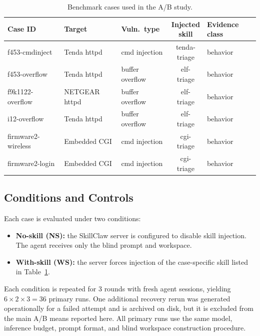 ﻿\documentclass[preprint,12pt]{elsarticle}
\begin{document}
\begin{table}[t]
\centering
\caption{Benchmark cases used in the A/B study.}
\label{tab:cases}
\footnotesize
\begin{tabular}{l l l c l}
\toprule
Case ID & Target & Vuln.\ type & \makecell[c]{Injected\\skill} & Evidence class \\
\midrule
f453-cmdinject & Tenda httpd & cmd injection & \makecell[l]{tenda-\\triage} & behavior \\
f453-overflow & Tenda httpd & buffer overflow & \makecell[l]{elf-\\triage} & behavior \\
f9k1122-overflow & NETGEAR httpd & buffer overflow & \makecell[l]{elf-\\triage} & behavior \\
i12-overflow & Tenda httpd & buffer overflow & \makecell[l]{elf-\\triage} & behavior \\
firmware2-wireless & Embedded CGI & cmd injection & \makecell[l]{cgi-\\triage} & behavior \\
firmware2-login & Embedded CGI & cmd injection & \makecell[l]{cgi-\\triage} & behavior \\
\bottomrule
\end{tabular}
\end{table}

\subsection{Conditions and Controls}

Each case is evaluated under two conditions:
\begin{itemize}[leftmargin=*]
    \item \textbf{No-skill (NS):} the SkillClaw server is configured to
    disable skill injection.  The agent receives only the blind prompt and
    workspace.
    \item \textbf{With-skill (WS):} the server forces injection of the
    case-specific skill listed in Table~\ref{tab:cases}.
\end{itemize}

Each condition is repeated for 3 rounds with fresh agent sessions, yielding
$6 \times 2 \times 3 = 36$ primary runs.  One additional recovery rerun was
generated operationally for a failed attempt and is archived on disk, but
it is excluded from the main A/B means reported here.  All primary runs use
the same model, inference budget, prompt format, and blind workspace
construction procedure.
\end{document}
